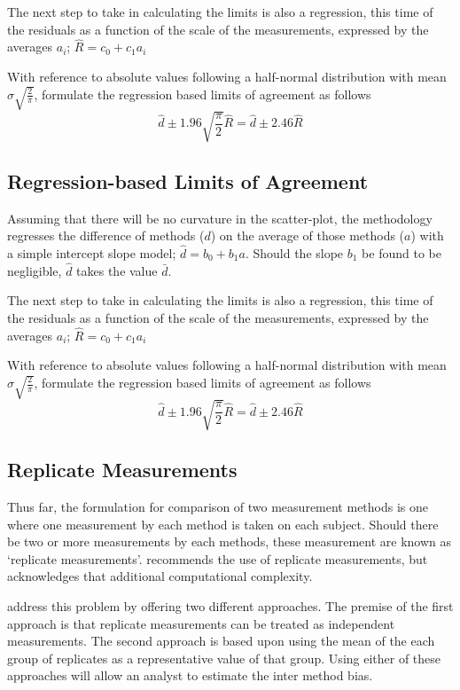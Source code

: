 \documentclass[12pt, a4paper]{report}
\begin{document}
	The next step to take in calculating the limits is also a
	regression, this time of the residuals as a function of the scale
	of the measurements, expressed by the averages $a_{i}$;
	$ \hat{R} = c_{0}+ c_{1}a_{i}$
	
	With reference to absolute values following a half-normal
	distribution with mean $\sigma\sqrt{\frac{2}{\pi}}$, \citet{BA99} formulate the regression based limits of agreement as
	follows
	\begin{equation}
	\hat{d} \pm 1.96\sqrt{\frac{\pi}{2}}\hat{R} = \hat{d} \pm 2.46\hat{R}
	\end{equation}
	
	\subsection{Regression-based Limits of Agreement} Assuming that
	there will be no curvature in the scatter-plot, the methodology
	regresses the difference of methods ($d$) on the average of those
	methods ($a$) with a simple intercept slope model; $\hat{d} =
	b_{0}+ b_{1}a.$ Should the slope $b_{1}$ be found to be
	negligible, $\hat{d}$ takes the value $\bar{d}$.
	
	The next step to take in calculating the limits is also a
	regression, this time of the residuals as a function of the scale
	of the measurements, expressed by the averages $a_{i}$;
	$ \hat{R} = c_{0}+ c_{1}a_{i}$
	
	With reference to absolute values following a half-normal
	distribution with mean $\sigma\sqrt{\frac{2}{\pi}}$, \citet{BA99} formulate the regression based limits of agreement as
	follows
	\begin{equation}
	\hat{d} \pm 1.96\sqrt{\frac{\pi}{2}}\hat{R} = \hat{d} \pm 2.46\hat{R}
	\end{equation}

	\subsection{Replicate Measurements}
	
	Thus far, the formulation for comparison of two measurement
	methods is one where one measurement by each method is taken on
	each subject. Should there be two or more measurements by each
	methods, these measurement are known as `replicate measurements'.
	\citet{BXC2008} recommends the use of replicate measurements, but
	acknowledges that  additional computational complexity.
	
	\citet*{BA86} address this problem by offering two different approaches. The premise of the first approach is that replicate
	measurements can be treated as independent measurements. The
	second approach is based upon using the mean of the each group of
	replicates as a representative value of that group. Using either
	of these approaches will allow an analyst to estimate the inter
	method bias.
	
\end{document}
